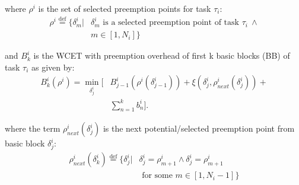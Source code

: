 \noindent
where \begin{math}\rho^{i}\end{math} is the set of selected preemption points for task \begin{math}\tau_{i}\end{math}:
\begin{equation}\label{eqn:pp-set}
\begin{split}
   \rho^{i} \stackrel{\text{def}}{=} \{\delta_{m}^{i}|&\delta_{m}^{i} \text{ is a selected preemption point of task } \tau_{i}\ \wedge \\ &m \in [1,N_{i}]\}
\end{split}
\end{equation}

\noindent
and \begin{math}B_{k}^{i}\end{math} is the WCET with preemption overhead of first k basic blocks (BB) of task \begin{math}\tau_{i}\end{math} as given by:
\begin{equation}\label{eqn:bbkwcet-cost}
\begin{split}
   B_{k}^{i}(\rho^{i}) = \min_{\delta_{j}^{i}} \Big[&B_{j-1}^{i}(\rho^{i}(\delta_{j-1}^{i})) + \xi(\delta_{j}^{i},\rho_{next}^{i}(\delta_{j}^{i})) + \\ &\sum_{n=1}^{k}b_{n}^{i}\Big].
\end{split}
\end{equation}

\noindent
where the term \begin{math}\rho_{next}^{i}(\delta_{j}^{i})\end{math} is the next potential/selected preemption point from basic block \begin{math}\delta_{j}^{i}\end{math}:
\begin{equation}\label{eqn:ppnext-set}
\begin{split}
   \rho_{next}^{i}(\delta_{k}^{i}) \stackrel{\text{def}}{=} \{\delta_{j}^{i}|&\delta_{j}^{i} = \rho_{m+1}^{i} \wedge \delta_{j}^{i} = \rho_{m+1}^{i} \\ &\textrm{ for some } m \in [1,N_{i}-1]\}
\end{split}
\end{equation}

